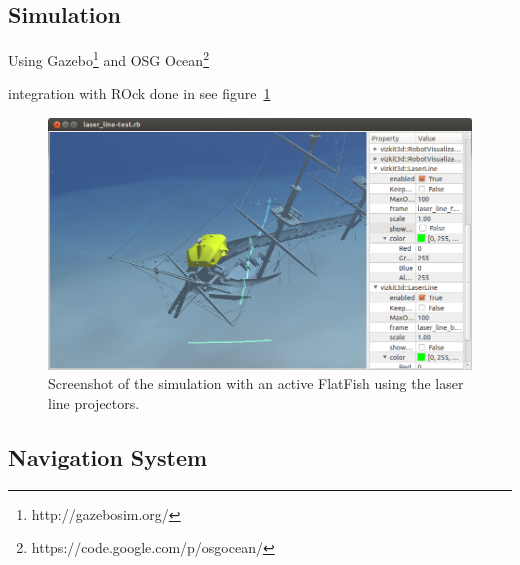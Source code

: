 \documentclass[conference]{IEEEtran}
\begin{document}
\subsection{Simulation}

Using Gazebo\footnote{http://gazebosim.org/} and OSG Ocean\footnote{https://code.google.com/p/osgocean/}

integration with ROck done in \cite{watanabe2015} see figure~\ref{fig:simulation}

\begin{figure}[!t]
	\centering
	\includegraphics[width=0.9\columnwidth]{flatfish_simulation}
	\caption{Screenshot of the simulation with an active FlatFish using the laser line projectors.}
	\label{fig:simulation}
\end{figure}


\subsection{Navigation System}
\end{document}
